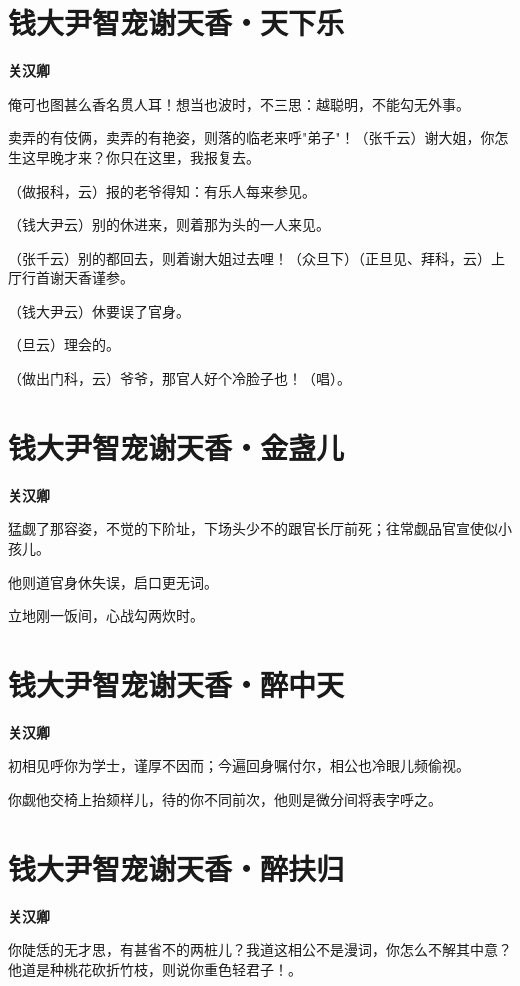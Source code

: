 \documentclass[12pt,a4paper]{ctexbook}
\begin{document}
\section{钱大尹智宠谢天香・天下乐}
\textbf{关汉卿}\par\vspace{0.5em}
俺可也图甚么香名贯人耳！想当也波时，不三思：越聪明，不能勾无外事。\par
卖弄的有伎俩，卖弄的有艳姿，则落的临老来呼"弟子"！（张千云）谢大姐，你怎生这早晚才来？你只在这里，我报复去。\par
（做报科，云）报的老爷得知：有乐人每来参见。\par
（钱大尹云）别的休进来，则着那为头的一人来见。\par
（张千云）别的都回去，则着谢大姐过去哩！（众旦下）（正旦见、拜科，云）上厅行首谢天香谨参。\par
（钱大尹云）休要误了官身。\par
（旦云）理会的。\par
（做出门科，云）爷爷，那官人好个冷脸子也！（唱）。\par

\section{钱大尹智宠谢天香・金盏儿}
\textbf{关汉卿}\par\vspace{0.5em}
猛觑了那容姿，不觉的下阶址，下场头少不的跟官长厅前死；往常觑品官宣使似小孩儿。\par
他则道官身休失误，启口更无词。\par
立地刚一饭间，心战勾两炊时。\par

\section{钱大尹智宠谢天香・醉中天}
\textbf{关汉卿}\par\vspace{0.5em}
初相见呼你为学士，谨厚不因而；今遍回身嘱付尔，相公也冷眼儿频偷视。\par
你觑他交椅上抬颏样儿，待的你不同前次，他则是微分间将表字呼之。\par

\section{钱大尹智宠谢天香・醉扶归}
\textbf{关汉卿}\par\vspace{0.5em}
你陡恁的无才思，有甚省不的两桩儿？我道这相公不是漫词，你怎么不解其中意？他道是种桃花砍折竹枝，则说你重色轻君子！。\par
\end{document}
